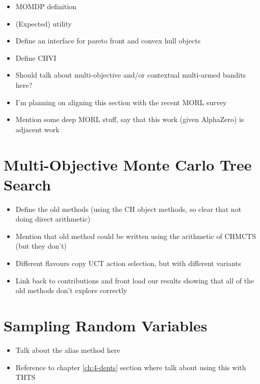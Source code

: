     \begin{itemize}
        \item MOMDP definition
        \item (Expected) utility
        \item Define an interface for pareto front and convex hull objects
        \item Define CHVI
        \item Should talk about multi-objective and/or contextual multi-armed bandits here?
        \item I'm planning on aligning this section with the recent MORL survey \cite{morl_survey}
        \item Mention some deep MORL stuff, say that this work (given AlphaZero) is adjacent work
    \end{itemize}

\section{Multi-Objective Monte Carlo Tree Search}
\label{sec:2-4-momcts}


    \begin{itemize}
        \item Define the old methods (using the CH object methods, so clear that not doing direct arithmetic)
        \item Mention that old method could be written using the arithmetic of CHMCTS (but they don't) 
        \item Different flavours copy UCT action selection, but with different variants
        \item Link back to contributions and front load our results showing that all of the old methods don't explore correctly
    \end{itemize}

\section{Sampling Random Variables}
\label{sec:2-5-sampling}

    \begin{itemize}
        \item Talk about the alias method here
        \item Reference to chapter \ref{ch:4-dents} section where talk about using this with THTS
    \end{itemize}